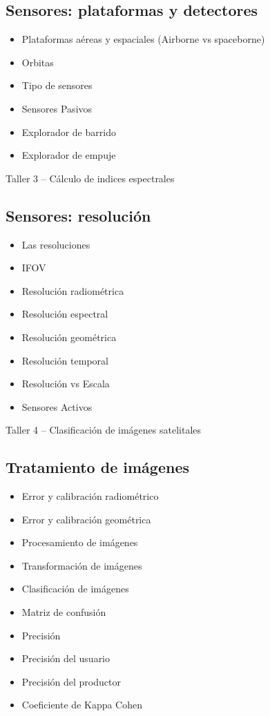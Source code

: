 \documentclass[a4paper,twoside,11pt,]{article}
\begin{document}
\subsection {Sensores: plataformas y detectores}
\begin{itemize}
\item Plataformas aéreas y espaciales (Airborne vs spaceborne)
\item Orbitas
\item Tipo de sensores
\item Sensores Pasivos
\item Explorador de barrido
\item Explorador de empuje
\end{itemize}

\begin{tcolorbox}[enhanced,width=5in,center upper,  fontupper=\large\bfseries,drop shadow southwest,sharp corners]
Taller 3 -- Cálculo de indices espectrales
\end{tcolorbox}

\subsection {Sensores: resolución}
\begin{itemize}
\item Las resoluciones
\item IFOV
\item Resolución radiométrica
\item Resolución espectral
\item Resolución geométrica
\item Resolución temporal
\item Resolución vs Escala
\item Sensores Activos
\end{itemize}

\begin{tcolorbox}[enhanced,width=5in,center upper,  fontupper=\large\bfseries,drop shadow southwest,sharp corners]
Taller 4 -- Clasificación de imágenes satelitales
\end{tcolorbox}

\subsection {Tratamiento de imágenes}
\begin{itemize}
\item Error y calibración radiométrico
\item Error y calibración geométrica
\item Procesamiento de imágenes
\item Transformación de imágenes
\item Clasificación de imágenes
\item Matriz de confusión
\item Precisión
\item Precisión del usuario
\item Precisión del productor
\item Coeficiente de Kappa Cohen
\end{itemize}
\end{document}
